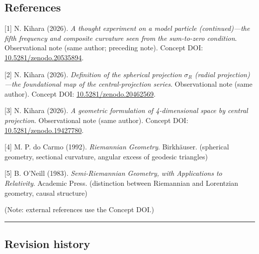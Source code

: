 \documentclass[
]{article}
\begin{document}
\subsection{References}\label{references}

{[}1{]} N. Kihara (2026). \emph{A thought experiment on a model particle
(continued)---the fifth frequency and composite curvature seen from the
sum-to-zero condition}. Observational note (same author; preceding
note). Concept DOI:
\href{https://doi.org/10.5281/zenodo.20535894}{10.5281/zenodo.20535894}.

{[}2{]} N. Kihara (2026). \emph{Definition of the spherical projection
\(\sigma_R\) (radial projection)---the foundational map of the
central-projection series}. Observational note (same author). Concept
DOI:
\href{https://doi.org/10.5281/zenodo.20462569}{10.5281/zenodo.20462569}.

{[}3{]} N. Kihara (2026). \emph{A geometric formulation of 4-dimensional
space by central projection}. Observational note (same author). Concept
DOI:
\href{https://doi.org/10.5281/zenodo.19427780}{10.5281/zenodo.19427780}.

{[}4{]} M. P. do Carmo (1992). \emph{Riemannian Geometry}. Birkhäuser.
(spherical geometry, sectional curvature, angular excess of geodesic
triangles)

{[}5{]} B. O'Neill (1983). \emph{Semi-Riemannian Geometry, with
Applications to Relativity}. Academic Press. (distinction between
Riemannian and Lorentzian geometry, causal structure)

(Note: external references use the Concept DOI.)

\begin{center}\rule{0.5\linewidth}{0.5pt}\end{center}

\subsection{Revision history}\label{revision-history}
\end{document}
